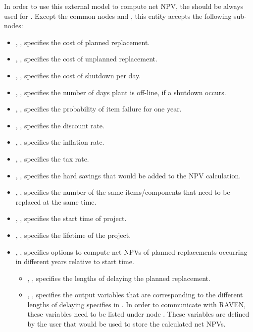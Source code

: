 In order to use this external model to compute net NPV, the 
should be always used for . Except the common nodes 
and , this entity accepts the following sub-nodes:
\begin{itemize}
  \item {}, , specifies the cost of planned replacement.
  \item {}, , specifies the cost of unplanned replacement.
  \item {}, , specifies the cost of shutdown per day.
  \item {}, , specifies the number of days
  plant is off-line, if a shutdown occurs.
  \item {}, , specifies the probability
  of item failure for one year.
  \item {}, , specifies the discount rate.
  \item {}, , specifies the inflation rate.
  \item {}, , specifies the tax rate.
  \item {}, , specifies the hard
  savings that would be added to the NPV calculation.
  \item {}, , specifies the number
  of the same items/components that need to be replaced at the same time.
  \item {}, , specifies the
  start time of project.
  \item {}, , specifies the lifetime
  of the project.
  \item {}, , specifies options to compute
  net NPVs of planned replacements occurring in different years relative to start time.
  \begin{itemize}
    \item {}, ,
    specifies the lengths of delaying the planned replacement.
    \item {}, ,
    specifies the output variables that are corresponding to the different lengths of
    delaying specifies in . In order to communicate with RAVEN, these
    variables need to be listed under node .
    \nb These variables are defined by the user that would be used to store the
    calculated net NPVs.
  \end{itemize}
\end{itemize}

